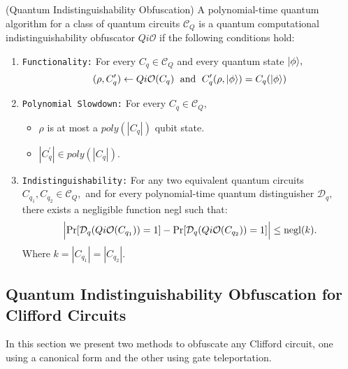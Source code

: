 \begin{definition}{\rm (Quantum Indistinguishability Obfuscation)}
\label{def:QiO} 
A  polynomial-time quantum algorithm for a class of quantum circuits $\mathcal{C}_Q$ is a quantum computational indistinguishability obfuscator $Qi\mathcal{O}$  if the following conditions hold:

\begin{enumerate}
\item {\tt Functionality:}  For every $C_q\in \mathcal{C}_Q$ and every quantum state ${\lvert}\phi\rangle,$
$$(\rho, C_q^\prime)\leftarrow Qi\mathcal{O}(C_q) \;  \mbox{ and }\; C_q^\prime(\rho,{\lvert}\phi\rangle)=C_{q}({\lvert}\phi\rangle)$$
											

\item  {\tt Polynomial Slowdown:}  For every $C_{q}\in \mathcal{C}_Q,$
\begin{itemize}
\item  $\rho$ is at most a $poly(|C_{q}|)$ qubit state. 
\item $|C_{q}^\prime| \in poly(|C_{q}|).$
\end{itemize}

\item {\tt Indistinguishability:} For any two equivalent quantum circuits $C_{q_1},C_{q_2}\in \mathcal{C}_Q,$ 
 and for every polynomial-time quantum distinguisher $\mathcal{D}_q,$ there exists a negligible function {\rm negl} such that:
					$$\Big |{\rm Pr}[\mathcal{D}_q(Qi\mathcal{O}(C_{q_1}))=1]-{\rm Pr}[\mathcal{D}_q(Qi\mathcal{O}(C_{q_2}))=1] \Big |\leq  {\rm negl}(k).$$		
Where $k=|C_{q_1}|=|C_{q_2}|.$						
\end{enumerate}
\end{definition}


\subsection{Quantum Indistinguishability Obfuscation for Clifford Circuits}
\label{QiO:Clifford-Circuits}
 In this section we present two methods to obfuscate any Clifford circuit,  one using a canonical form and the other using gate teleportation.

